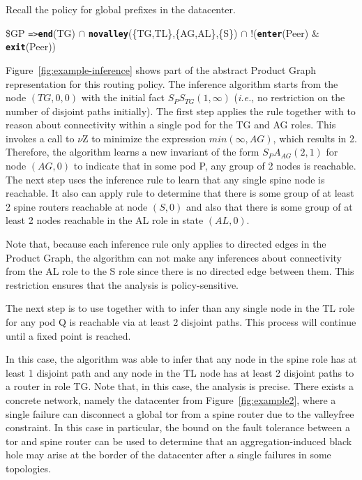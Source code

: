 \documentclass[numbers, 10pt, preprint]{sigplanconf}
\newcommand{\IE}{\emph{i.e.}}
\newcommand{\KW}[1]{\texttt{\small\bfseries{#1}}}
\newcommand{\Path}{\texttt{=>}}
\newcommand{\Exit}{\KW{exit}}
\newcommand{\End}{\KW{end}}
\newcommand{\Enter}{\KW{enter}}
\newcommand{\Novalley}{\KW{novalley}}
\begin{document}
Recall the policy for global prefixes in the datacenter. 
%
\begin{code}
\$GP \Path \End(TG) \ensuremath{\cap} 
       \Novalley(\{TG,TL\},\{AG,AL\},\{S\}) \ensuremath{\cap} 
       !(\Enter(Peer) & \Exit(Peer))
\end{code}
\noindent
%
Figure~\ref{fig:example-inference} shows part of the abstract Product Graph representation for this routing policy. The inference algorithm starts from the node $(TG,0,0)$ with the initial fact $S_P S_{TG}(1,\infty)$ (\IE, no restriction on the number of disjoint paths initially).
%
The first step applies the rule  together with  to reason about connectivity within a single pod for the TG and AG roles. This invokes a call to $\nu$Z to minimize the expression $min(\infty, AG)$, which results in 2. Therefore, the algorithm learns a new invariant of the form $S_P A_{AG} (2,1)$ for node $(AG, 0)$ to indicate that in some pod P, any group of 2 nodes is reachable.
%
The next step uses the inference rule  to learn that any single spine node is reachable. It also can apply rule  to determine that there is some group of at least 2 spine routers reachable at node $(S,0)$ and also that there is some group of at least 2 nodes reachable in the AL role in state $(AL,0)$.

Note that, because each inference rule only applies to directed edges in the Product Graph, the algorithm can not make any inferences about connectivity from the AL role to the S role since there is no directed edge between them. This restriction ensures that the analysis is policy-sensitive.

The next step is to use  together with  to infer than any single node in the TL role for any pod Q is reachable via at least 2 disjoint paths. This process will continue until a fixed point is reached.

In this case, the algorithm was able to infer that any node in the spine role has at least 1 disjoint path and any node in the TL node has at least 2 disjoint paths to a router in role TG. Note that, in this case, the analysis is precise. There exists a concrete network, namely the datacenter from Figure~\ref{fig:example2}, where a single failure can disconnect a global tor from a spine router due to the valleyfree constraint. In this case in particular, the bound on the fault tolerance between a tor and spine router can be used to determine that an aggregation-induced black hole may arise at the border of the datacenter after a single failures in some topologies.
\end{document}

